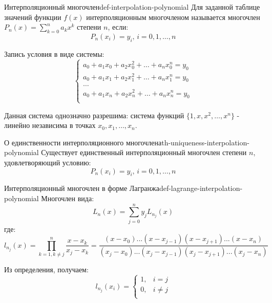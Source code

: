 \documentclass[14pt]{extarticle}
\begin{document}
    \begin{definition}{Интерполяционный многочлен}{def-interpolation-polynomial}
        Для заданной таблице значений функции $f(x)$ интерполяционным многочленом называется многочлен $P_{n}(x) = \sum_{k=0}^{n} a_{k}x^{k}$ степени $n$, если:
        $$P_{n}(x_{i}) = y_{i} \text{, } i = 0, 1, \ldots, n$$
    
        Запись условия в виде системы:
        $$
        \begin{cases}
            a_{0} + a_{1}x_{0} + a_{2}x_{0}^{2} + \ldots + a_{n}x_{0}^{n} = y_{0}\\ 
            a_{0} + a_{1}x_{1} + a_{2}x_{1}^{2} + \ldots + a_{n}x_{1}^{n} = y_{0}\\ 
            \ldots\\
            a_{0} + a_{1}x_{n} + a_{2}x_{n}^{2} + \ldots + a_{n}x_{n}^{n} = y_{0}\\ 
        \end{cases}
        $$

        Данная система однозначно разрешима: система функций $\{1, x, x^{2}, \ldots, x^{n}\}$ - линейно независима в точках $x_{0}, x_{1}, \ldots, x_{n}$.
    \end{definition}

    \begin{theorem}{О единственности интерполяционного многочлена}{th-uniqueness-interpolation-polynomial}
        Существует единственный интерполяционный многочлен степени $n$, удовлетворяющий условию:
        $$P_{n}(x_{i}) = y_{i} \text{, } i = 0, 1, \ldots, n$$
    \end{theorem}

    \begin{definition}{Интерполяционный многочлен в форме Лагранжа}{def-lagrange-interpolation-polynomial}
        Многочлен вида:
        $$L_{n}(x) = \sum_{j = 0}^{n} y_{j}L_{n_{j}}(x)$$
        где:
        $$l_{n_{j}}(x) = \prod_{k = 1, k \neq j}^{n} \frac{x - x_{k}}{x_{j} - x_{k}} = \frac{(x - x_{0}) ... (x - x_{j-1})(x-x_{j+1}) ... (x - x_{n})}{(x_{j} - x_{0}) ... (x_{j} - x_{j - 1})(x_{j} - x_{j + 1}) ... (x_{j} - x_{n})}$$
    
        Из определения, получаем:
        $$
        l_{n_{j}}(x_{i}) = \begin{cases}
            1, & i = j\\
            0, & i \neq j\\
        \end{cases}
        $$
    \end{definition}
\end{document}

